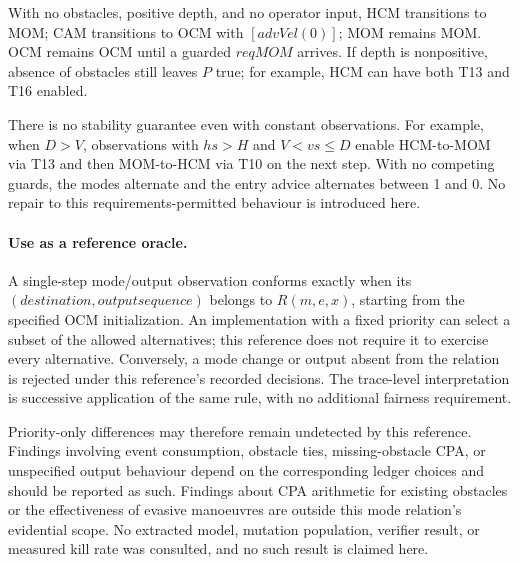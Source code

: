 \documentclass[10pt,a4paper]{article}
\begin{document}
With no obstacles, positive depth, and no operator input, HCM transitions to MOM; CAM transitions to OCM with $[\mathit{advVel}(0)]$; MOM remains MOM. OCM remains OCM until a guarded $\mathit{reqMOM}$ arrives. If depth is nonpositive, absence of obstacles still leaves $\mathit{P}$ true; for example, HCM can have both T13 and T16 enabled.

There is no stability guarantee even with constant observations. For example, when $\mathit{D} > \mathit{V}$, observations with $\mathit{hs} > \mathit{H}$ and $\mathit{V} < \mathit{vs} \le  \mathit{D}$ enable HCM-to-MOM via T13 and then MOM-to-HCM via T10 on the next step. With no competing guards, the modes alternate and the entry advice alternates between 1 and 0. No repair to this requirements-permitted behaviour is introduced here.

\paragraph{Use as a reference oracle.} A single-step mode/output observation conforms exactly when its $(\mathit{destination}, \mathit{output} \mathit{sequence})$ belongs to $\mathit{R}(\mathit{m},\mathit{e},\mathit{x})$, starting from the specified OCM initialization. An implementation with a fixed priority can select a subset of the allowed alternatives; this reference does not require it to exercise every alternative. Conversely, a mode change or output absent from the relation is rejected under this reference's recorded decisions. The trace-level interpretation is successive application of the same rule, with no additional fairness requirement.

Priority-only differences may therefore remain undetected by this reference. Findings involving event consumption, obstacle ties, missing-obstacle CPA, or unspecified output behaviour depend on the corresponding ledger choices and should be reported as such. Findings about CPA arithmetic for existing obstacles or the effectiveness of evasive manoeuvres are outside this mode relation's evidential scope. No extracted model, mutation population, verifier result, or measured kill rate was consulted, and no such result is claimed here.
\end{document}
